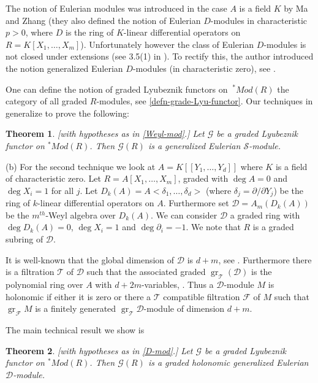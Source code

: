 \documentclass{amsart}
\newcommand{\D}{\mathcal{D} }
\newcommand{\T}{\mathcal{T} }
\newcommand{\F}{\mathcal{F} }
\newcommand{\Sc}{\mathcal{S} }
\newcommand{\gr}{\operatorname{gr}}
\theoremstyle{plain}
\newtheorem{theorem}{Theorem}[section]
\theoremstyle{definition}
\theoremstyle{remark}
\begin{document}
The notion of Eulerian modules was introduced in the case $A$ is a field $K$ by Ma and Zhang \cite{MaZhang} (they also defined the notion of Eulerian  $D$-modules in characteristic $p > 0$, where $D$ is the ring of $K$-linear  differential operators on $R = K[X_1,\ldots, X_m]$). Unfortunately however the class of Eulerian $D$-modules is not closed under extensions (see 3.5(1) in \cite{MaZhang}). To rectify this,   the author introduced the notion generalized Eulerian $D$-modules (in characteristic zero), see \cite{P2}.

One can define the notion of graded Lyubeznik functors on $\ ^*Mod(R)$ the category of all graded $R$-modules, see \ref{defn-grade-Lyu-functor}. 
Our techniques in \cite[ Theorem 1.7]{PS}  generalize to prove the following:
\begin{theorem}\label{third}[with hypotheses as in \ref{Weyl-mod}.]
 Let $\mathcal{G}$ be a graded Lyubeznik functor on $^*Mod(R)$. Then  $\mathcal{G}(R)$ is a generalized Eulerian $\Sc$-module.  
\end{theorem}

\s \label{D-mod}(b) For the second technique we look at $A= K[[Y_1,\ldots, Y_d]]$ where $K$ is a field of characteristic zero. Let  $R = A[X_1,\ldots,X_m]$, graded with $\deg A = 0$ and $\deg X_i = 1$ for all $j$. Let $D_k(A) = A<\delta_1,\ldots, \delta_d>$ (where $\delta_j = \partial /\partial Y_j$) be the ring of $k$-linear differential operators on  $A$. Furthermore set $\D = A_m(D_k(A))$ be the $m^{th}$-Weyl algebra over $D_k(A)$. We
can consider $\D$ a graded ring with $\deg D_k(A) = 0$, $\deg X_i = 1$ and $\deg \partial_i = -1$.  We note that $R$ is a graded subring of $\D$. 

It is well-known that the global dimension of $\D$ is $d + m$, see \cite[3.1.9]{Bjork}. Furthermore there is
a filtration $\mathcal{T}$ of $\D$ such that the associated graded $\gr_\T(\D)$ is the polynomial ring over $A$ with
$d + 2m$-variables, \cite[3.1.9]{Bjork}. Thus a  $\D$-module $M$ is holonomic if either it is zero  or there a
$\T$ compatible filtration $\F$ of $M$ such that 
$\gr_\F M$ is a finitely generated $\gr_\T \D$-module of dimension $d + m$. 

The main technical result we show is
\begin{theorem}\label{m-tech-cor}[with hypotheses as in \ref{D-mod}.]
Let $\mathcal{G}$ be a graded Lyubeznik functor on $^*Mod(R)$. Then  $\mathcal{G}(R)$ is a graded holonomic generalized Eulerian $\D$-module.
\end{theorem}
\end{document}
